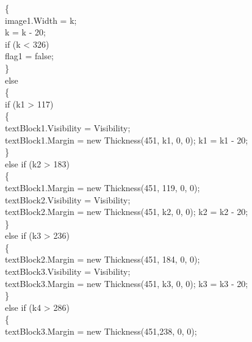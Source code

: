 {{                        \{\\
                            image1.Width = k;\\
                            k = k - 20;\\
                            if (k < 326)\\
                                flag1 = false;\\
                        \}\\
                        else\\
                        \{\\
                            if (k1 > 117)\\
                            \{\\
                                textBlock1.Visibility = Visibility;\\
                                textBlock1.Margin = new Thickness(451, k1, 0, 0); k1 = k1 - 20;\\
                            \}\\
                            else if (k2 > 183)\\
                            \{\\
                                textBlock1.Margin = new Thickness(451, 119, 0, 0);\\
                                textBlock2.Visibility = Visibility;\\
                                textBlock2.Margin = new Thickness(451, k2, 0, 0); k2 = k2 - 20;\\
                            \}\\
                            else if (k3 > 236)\\
                            \{\\
                                textBlock2.Margin = new Thickness(451, 184, 0, 0);\\
                                textBlock3.Visibility = Visibility;\\
                                textBlock3.Margin = new Thickness(451, k3, 0, 0); k3 = k3 - 20;\\
                            \}\\
                            else if (k4 > 286)\\
                            \{\\
                                textBlock3.Margin = new Thickness(451,238, 0, 0);\\
}}

